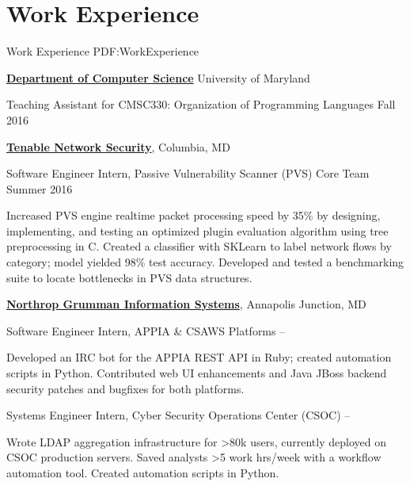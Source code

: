 
\section
{Work Experience}
{Work Experience}
{PDF:WorkExperience}

\href{https://cs.umd.edu/}
{\textbf{Department of Computer Science}}
University of Maryland
\hfill

\GapNoBreak
\hspace{1em} Teaching Assistant for CMSC330: Organization of Programming Languages
\hfill
Fall 2016

\GapNoBreak
\href{https://www.tenable.com/}
{\textbf{Tenable Network Security}},
Columbia, MD

\GapNoBreak
\hspace{1em} Software Engineer Intern, Passive Vulnerability Scanner (PVS) Core Team
\hfill
Summer 2016
\begin{detail}
\SubBulletItem
Increased PVS engine realtime packet processing speed by 35\% by designing, implementing, and testing an optimized plugin evaluation algorithm using tree preprocessing in C.
\SubBulletItem
Created a classifier with SKLearn to label network flows by category; model yielded 98\% test accuracy.
\SubBulletItem
Developed and tested a benchmarking suite to locate bottlenecks in PVS data structures.
\end{detail}

\Gap
\href{https://www.ngc.com/}
{\textbf{Northrop Grumman Information Systems}},
Annapolis Junction, MD

\GapNoBreak
\hspace{1em} 
Software Engineer Intern, APPIA \& CSAWS Platforms
\hfill
{} --
\begin{detail}
\SubBulletItem
Developed an IRC bot for the APPIA REST API in Ruby; created automation scripts in Python.
\SubBulletItem
Contributed web UI enhancements and Java JBoss backend security patches and bugfixes for both platforms.
\end{detail}

\GapNoBreak
\hspace{1em} 
Systems Engineer Intern, Cyber Security Operations Center (CSOC)
\hfill
{} --
\begin{detail}
\SubBulletItem
Wrote LDAP aggregation infrastructure for >80k users, currently deployed on CSOC production servers.
\SubBulletItem
Saved analysts >5 work hrs/week with a workflow automation tool. Created automation scripts in Python.
\end{detail}
